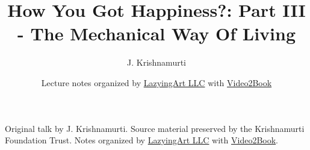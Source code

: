 \documentclass[11pt,oneside]{book}
\begin{document}
\frontmatter
\title{How You Got Happiness?: Part III - The Mechanical Way Of Living}
\author{J. Krishnamurti}
\date{Lecture notes organized by \href{https://lazying.art}{LazyingArt LLC} with \href{https://github.com/lachlanchen/Video2Book}{Video2Book}}
\maketitle
\begin{center}
\small Original talk by J. Krishnamurti. Source material preserved by the Krishnamurti Foundation Trust. Notes organized by \href{https://lazying.art}{LazyingArt LLC} with \href{https://github.com/lachlanchen/Video2Book}{Video2Book}.
\end{center}
\clearpage
\mainmatter

\end{document}
